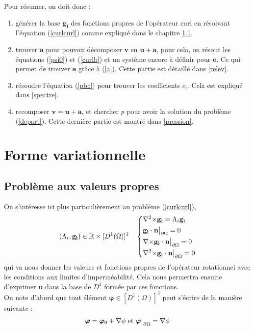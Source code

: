 Pour résumer, on doit donc :
\begin{enumerate}
\item générer la base $\mathbf{g_i}$ des fonctions propres de l'opérateur curl en résolvant l'équation (\ref{curlcurl}) comme expliqué dans le chapitre \ref{eigen}.
\item trouver $\mathbf{a}$ pour pouvoir décomposer $\mathbf{v}$ en $\mathbf{u}+\mathbf{a}$, pour cela, on résout les équations (\ref{psi0}) et (\ref{curlb}) et un système encore à définir pour $\bm{e}$. Ce qui permet de trouver $\mathbf{a}$ grâce à (\ref{a}). Cette partie est détaillé dans \ref{relev}.
\item résoudre l'équation (\ref{pbc}) pour trouver les coefficients $c_i$. Cela est expliqué dans \ref{spectre}.
\item recomposer $\mathbf{v}=\mathbf{u}+\mathbf{a}$, et chercher $p$ pour avoir la solution du problème (\ref{depart}). Cette dernière partie est montré dans \ref{pression}.
\end{enumerate}

\chapter{Forme variationnelle}
\label{fv}
\section{Problème aux valeurs propres}
\label{eigen}
On s'intéresse ici plus particulièrement au problème (\ref{curlcurl}),
\begin{equation}\label{pbeigen}
(\Lambda_i,\mathbf{g_i})\in{\mathbb{R}}\times [D^1(\Omega)]^3\quad \left\{\begin{aligned}
&{\nabla^2\times}  \mathbf{g_i} = \Lambda_i \mathbf{g_i}\\
&\mathbf{g_i}\cdot \mathbf{n}{\big\rvert_{\partial\Omega}} = 0\\
&{\nabla\times} \mathbf{g_i}\cdot \mathbf{n}{\big\rvert_{\partial\Omega}} = 0\\
&{\nabla^2\times}  \mathbf{g_i}\cdot \mathbf{n}{\big\rvert_{\partial\Omega}} = 0
\end{aligned}\right.
\end{equation}
qui va nous donner les valeurs et fonctions propres de l'opérateur rotationnel avec les conditions aux limites d'imperméabilité. Cela nous permettra ensuite d'exprimer $\bm{u}$ dans la base de $D^1$ formée par ces fonctions.\\

On note d'abord que tout élément $\bm{\varphi}\in [D^1(\Omega)]^3$ peut s'écrire de la manière suivante :
\[ \bm{\varphi} = \bm{\varphi}_0 + {\nabla}\phi\text{ et } \bm{\varphi}{\big\rvert_{\partial\Omega}} = {\nabla}\phi \]

